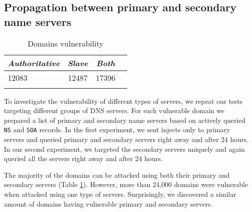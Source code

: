 \subsection{Propagation between primary and secondary name servers}

\begin{table}
  \caption{Domains vulnerability \label{tab:propagation_vulnerable}}
 \centering
\begin{tabular}{l*{3}{c}}
\Xhline{2\arrayrulewidth}
\textbf{\textit{Authoritative}}  & \textbf{\textit{Slave}} & \textbf{\textit{Both}} \\
\hline
12083 & 12487 & 17396 \\
\Xhline{2\arrayrulewidth}
 \end{tabular}
\end{table}



To investigate the vulnerability of different types of servers, we repeat our tests targeting different groups of DNS servers. For each vulnerable domain we prepared a list of primary and secondary name servers based on actively queried \texttt{NS} and \texttt{SOA} records. In the first experiment, we sent injects only to primary servers and queried primary and secondary servers right away and after 24 hours. In our second experiment, we targeted the secondary servers uniquely and again queried all the servers right away and after 24 hours. 

The majority of the domains can be attacked using both their primary and secondary servers (Table \ref{tab:propagation_vulnerable}). However, more than 24,000 domains were vulnerable when attacked using one type of servers. Surprisingly, we discovered a similar amount of domains having vulnerable primary and secondary servers. 

